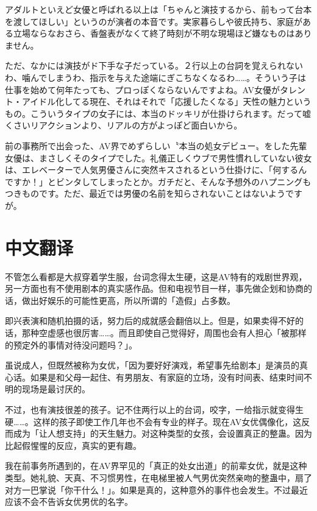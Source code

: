 \documentclass[12pt,UTF8]{ctexbook}
\begin{document}
アダルトといえど女優と呼ばれる以上は「ちゃんと演技するから、前もって台本を渡してほしい」というのが演者の本音です。実家暮らしや彼氏持ち、家庭がある立場ならなおさら、香盤表がなくて終了時刻が不明な現場ほど嫌なものはありません。

ただ、なかには演技がド下手な子だっている。２行以上の台詞を覚えられないわ、噛んでしまうわ、指示を与えた途端にぎこちなくなるわ……。そういう子は仕事を始めて何年たっても、プロっぽくならないんですよね。AV女優がタレント・アイドル化してる現在、それはそれで「応援したくなる」天性の魅力というもの。こういうタイプの女子には、本当のドッキリが仕掛けられます。だって嘘くさいリアクションより、リアルの方がよっぽど面白いから。

前の事務所で出会った、AV界でめずらしい〝本当の処女デビュー〟をした先輩女優は、まさしくそのタイプでした。礼儀正しくウブで男性慣れしていない彼女は、エレベーターで人気男優さんに突然キスされるという仕掛けに、「何するんですか！」とビンタしてしまったとか。ガチだと、そんな予想外のハプニングもつきものです。ただ、最近では男優の名前を知らされないことはないようですが。

\switchcolumn

\section*{中文翻译}

不管怎么看都是大叔穿着学生服，台词念得太生硬，这是AV特有的戏剧世界观，另一方面也有不使用剧本的真实感作品。但和电视节目一样，事先做企划和协商的话，做出好娱乐的可能性更高，所以所谓的「造假」占多数。

即兴表演和随机拍摄的话，努力后的成就感会翻倍以上。但是，如果卖得不好的话，那种空虚感也很厉害……。而且即使自己觉得好，周围也会有人担心「被那样的预定外的事情对待没问题吗？」。

虽说成人，但既然被称为女优，「因为要好好演戏，希望事先给剧本」是演员的真心话。如果是和父母一起住、有男朋友、有家庭的立场，没有时间表、结束时间不明的现场是最讨厌的。

不过，也有演技很差的孩子。记不住两行以上的台词，咬字，一给指示就变得生硬……。这样的孩子即使工作几年也不会有专业的样子。现在AV女优偶像化，这反而成为「让人想支持」的天生魅力。对这种类型的女孩，会设置真正的整蛊。因为比起假惺惺的反应，真实的更有趣。

我在前事务所遇到的，在AV界罕见的「真正的处女出道」的前辈女优，就是这种类型。她礼貌、天真、不习惯男性，在电梯里被人气男优突然亲吻的整蛊中，扇了对方一巴掌说「你干什么！」。如果是真的，这种意外的事件也会发生。不过最近应该不会不告诉女优男优的名字。
\end{document}
